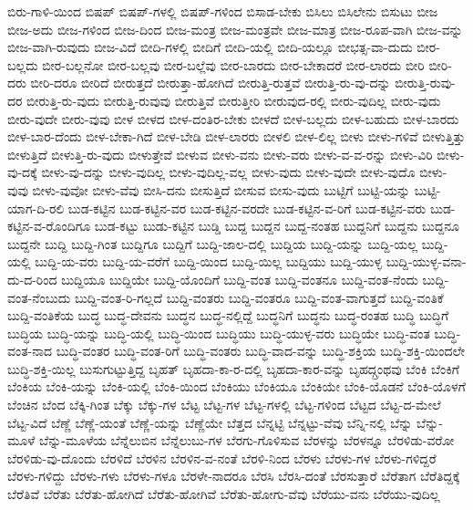 {ಬಿರು-ಗಾಳಿ-ಯಿಂದ
ಬಿಷಪ್
ಬಿಷಪ್-ಗಳಲ್ಲಿ
ಬಿಷಪ್-ಗಳಿಂದ
ಬಿಸಾಡ-ಬೇಕು
ಬಿಸಿಲು
ಬಿಸಿಲೇನು
ಬಿಸುಟು
ಬೀಜ
ಬೀಜ-ಅದು
ಬೀಜ-ಗಳಿಂದ
ಬೀಜ-ದಿಂದ
ಬೀಜ-ಮಂತ್ರ
ಬೀಜ-ಮಂತ್ರವೇ
ಬೀಜ-ಮಾತ್ರ
ಬೀಜ-ರೂಪ-ವಾಗಿ
ಬೀಜ-ವನ್ನು
ಬೀಜ-ವಾಗಿ-ರುವುದು
ಬೀಜ-ವಿದೆ
ಬೀದಿ-ಗಳಲ್ಲಿ
ಬೀದಿಗೆ
ಬೀದಿ-ಯಲ್ಲಿ
ಬೀದಿ-ಯಲ್ಲೂ
ಬೀಭತ್ಸ-ವಾ-ದುದು
ಬೀರ-ಬಲ್ಲದು
ಬೀರ-ಬಲ್ಲನೋ
ಬೀರ-ಬಲ್ಲವು
ಬೀರ-ಬಲ್ಲೆವು
ಬೀರ-ಬಾರದು
ಬೀರ-ಬೇಕಾದರೆ
ಬೀರ-ಲಾರದು
ಬೀರಿ
ಬೀರಿ-ದರು
ಬೀರಿ-ದರೂ
ಬೀರಿದೆ
ಬೀರುತ್ತದೆ
ಬೀರುತ್ತಾ-ಹೋಗಿದೆ
ಬೀರುತ್ತಿ-ರುತ್ತವೆ
ಬೀರುತ್ತಿ-ರು-ವು-ದನ್ನು
ಬೀರುತ್ತಿ-ರುವು-ದರ
ಬೀರುತ್ತಿ-ರು-ವುದು
ಬೀರುತ್ತಿ-ರುವುವು
ಬೀರುತ್ತಿವೆ
ಬೀರುತ್ತೀರಿ
ಬೀರುವುದ-ರಲ್ಲಿ
ಬೀರು-ವುದಿಲ್ಲ
ಬೀರು-ವುದು
ಬೀರು-ವುದೇ
ಬೀರು-ವುವು
ಬೀಳ
ಬೀಳದ
ಬೀಳ-ದಂತಿರ-ಬೇಕು
ಬೀಳದೆ
ಬೀಳ-ಬಲ್ಲದು
ಬೀಳ-ಬಹುದು
ಬೀಳ-ಬಾರದು
ಬೀಳ-ಬಾರ-ದೆಂದು
ಬೀಳ-ಬೇಕಾ-ಗಿದೆ
ಬೀಳ-ಬೇಡಿ
ಬೀಳ-ಲಾರರು
ಬೀಳಲಿ
ಬೀಳ-ಲಿಲ್ಲ
ಬೀಳು
ಬೀಳು-ಗಳಿವೆ
ಬೀಳುತ್ತಿತ್ತು
ಬೀಳುತ್ತಿದೆ
ಬೀಳುತ್ತಿ-ರು-ವುದು
ಬೀಳುತ್ತೇವೆ
ಬೀಳುವ
ಬೀಳು-ವನು
ಬೀಳು-ವರು
ಬೀಳು-ವ-ವ-ರನ್ನು
ಬೀಳು-ವಿರಿ
ಬೀಳು-ವು-ದಕ್ಕೆ
ಬೀಳು-ವು-ದನ್ನು
ಬೀಳು-ವುದಿಲ್ಲ
ಬೀಳು-ವುದಿಲ್ಲ-ವಲ್ಲ
ಬೀಳು-ವುದು
ಬೀಳು-ವುದೇ
ಬೀಳು-ವುದೊ
ಬೀಳು-ವುವು
ಬೀಳು-ವುವೋ
ಬೀಳು-ವೆವು
ಬೀಸಿ-ದನು
ಬೀಸುತ್ತಿದೆ
ಬೀಸುವ
ಬೀಸು-ವುದು
ಬುಟ್ಟಿಗೆ
ಬುಟ್ಟಿ-ಯನ್ನು
ಬುಟ್ಟಿ-ಯಾಗ-ದಿ-ರಲಿ
ಬುಡ-ಕಟ್ಟಿನ
ಬುಡ-ಕಟ್ಟಿನ-ವರ
ಬುಡ-ಕಟ್ಟಿನ-ವರದೇ
ಬುಡ-ಕಟ್ಟಿನ-ವ-ರಿಗೆ
ಬುಡ-ಕಟ್ಟಿನ-ವರು
ಬುಡ-ಕಟ್ಟಿನ-ವ-ರೊಂದಿಗೂ
ಬುಡ-ಕಟ್ಟು
ಬುಡು-ಕಟ್ಟಿನ
ಬುಡ್ಡಿ
ಬುದ್ದ
ಬುದ್ದನ
ಬುದ್ದ-ನಂತಹ
ಬುದ್ದನಿಗೆ
ಬುದ್ದನು
ಬುದ್ದನೂ
ಬುದ್ದನೇ
ಬುದ್ದಿ
ಬುದ್ದಿ-ಗಿಂತ
ಬುದ್ದಿಗೂ
ಬುದ್ದಿಗೆ
ಬುದ್ದಿ-ಜಾಲ-ದಲ್ಲಿ
ಬುದ್ದಿಯ
ಬುದ್ದಿ-ಯನ್ನು
ಬುದ್ದಿ-ಯಲ್ಲ
ಬುದ್ದಿ-ಯಲ್ಲಿ
ಬುದ್ದಿ-ಯ-ವರು
ಬುದ್ದಿ-ಯ-ವರೆಗೆ
ಬುದ್ದಿ-ಯಿಂದ
ಬುದ್ದಿ-ಯಿಲ್ಲ
ಬುದ್ದಿಯು
ಬುದ್ದಿ-ಯುಳ್ಳ
ಬುದ್ದಿ-ಯುಳ್ಳ-ವನಾ-ದು-ದ-ರಿಂದ
ಬುದ್ದಿಯೂ
ಬುದ್ದಿಯೇ
ಬುದ್ದಿ-ಯೊಂದಿಗೆ
ಬುದ್ದಿ-ವಂತ
ಬುದ್ದಿ-ವಂತನೂ
ಬುದ್ದಿ-ವಂತ-ನೆಂದು
ಬುದ್ದಿ-ವಂತ-ನೆಂಬುದು
ಬುದ್ದಿ-ವಂತ-ರಿ-ಗಲ್ಲದೆ
ಬುದ್ದಿ-ವಂತರು
ಬುದ್ದಿ-ವಂತರೂ
ಬುದ್ದಿ-ವಂತ-ವಾಗುತ್ತದೆ
ಬುದ್ದಿ-ವಂತಿಕೆ
ಬುದ್ದಿ-ವಂತಿಕೆಯ
ಬುದ್ಧ
ಬುದ್ಧ-ದೇವನು
ಬುದ್ಧನ
ಬುದ್ಧ-ನಲ್ಲಿದ್ದೆ
ಬುದ್ಧನಿಗೆ
ಬುದ್ಧನು
ಬುದ್ಧ-ರಂತಹ
ಬುದ್ಧಿ
ಬುದ್ಧಿಗೆ
ಬುದ್ಧಿಯ
ಬುದ್ಧಿ-ಯನ್ನು
ಬುದ್ಧಿ-ಯಲ್ಲಿ
ಬುದ್ಧಿ-ಯಿಂದ
ಬುದ್ಧಿಯು
ಬುದ್ಧಿ-ಯುಳ್ಳ-ವರು
ಬುದ್ಧಿಯೇ
ಬುದ್ಧಿ-ವಂತ
ಬುದ್ಧಿ-ವಂತ-ನಾದ
ಬುದ್ಧಿ-ವಂತರ
ಬುದ್ಧಿ-ವಂತ-ರಿಗೆ
ಬುದ್ಧಿ-ವಂತರು
ಬುದ್ಧಿ-ವಾದ-ವನ್ನು
ಬುದ್ಧಿ-ಶಕ್ತಿಯ
ಬುದ್ಧಿ-ಶಕ್ತಿ-ಯಿಂದಲೇ
ಬುದ್ಧಿ-ಶಕ್ತಿ-ಯಿಲ್ಲ
ಬುಸುಗುಟ್ಟುತ್ತಿದ್ದ
ಬೃಹತ್
ಬೃಹದಾ-ಕಾ-ರ-ದಲ್ಲಿ
ಬೃಹದಾ-ಕಾರ-ವನ್ನು
ಬೃಹದ್ಗ್ರಂಥವು
ಬೆಂಕಿ
ಬೆಂಕಿಗೆ
ಬೆಂಕಿಯ
ಬೆಂಕಿ-ಯನ್ನು
ಬೆಂಕಿ-ಯಲ್ಲಿ
ಬೆಂಕಿ-ಯಿಂದ
ಬೆಂಕಿಯು
ಬೆಂಕಿಯೂ
ಬೆಂಕಿಯೇ
ಬೆಂಕಿ-ಯೊಡನೆ
ಬೆಂಕಿ-ಯೊಳಗೆ
ಬೆಂಚಿನ
ಬೆಂದ
ಬೆಕ್ಕಿ-ಗಿಂತ
ಬೆಕ್ಕು
ಬೆಕ್ಕು-ಗಳ
ಬೆಟ್ಟ
ಬೆಟ್ಟ-ಗಳ
ಬೆಟ್ಟ-ಗಳಲ್ಲಿ
ಬೆಟ್ಟ-ಗಳಿಂದ
ಬೆಟ್ಟದ
ಬೆಟ್ಟ-ದ-ಮೇಲೆ
ಬೆಟ್ಟ-ವಿದೆ
ಬೆಣ್ಣೆ
ಬೆಣ್ಣೆ-ಯಂತೆ
ಬೆಣ್ಣೆ-ಯನ್ನು
ಬೆಣ್ಣೆಯೇ
ಬೆತ್ತದ
ಬೆನ್ನಟ್ಟಿ
ಬೆನ್ನಟ್ಟು-ವೆವು
ಬೆನ್ನಿ-ನಲ್ಲಿ
ಬೆನ್ನು
ಬೆನ್ನು-ಮೂಳೆ
ಬೆನ್ನು-ಮೂಳೆಯ
ಬೆನ್ನೆಲುಬಿನ
ಬೆನ್ನೆಲುಬು-ಗಳ
ಬೆರಗು-ಗೊಳಿಸುವ
ಬೆರಳನ್ನು
ಬೆರಳನ್ನೂ
ಬೆರಳಿಡು-ವರೋ
ಬೆರಳಿಡು-ವು-ದೊಂದು
ಬೆರಳಿದೆ
ಬೆರಳಿನ
ಬೆರಳಿನ-ವ-ನಂತೆ
ಬೆರಳಿ-ನಿಂದ
ಬೆರಳು
ಬೆರಳು-ಗಳ
ಬೆರಳು-ಗಳಿದ್ದರೆ
ಬೆರಳು-ಗಳಿದ್ದು
ಬೆರಳು-ಗಳು
ಬೆರಳು-ಗಳೂ
ಬೆರಳೇ-ನಾದರೂ
ಬೆರಸಿ
ಬೆರಸಿ-ದಂತೆ
ಬೆರಸುತ್ತಾರೆ
ಬೆರೆತಾಗ
ಬೆರೆತಿದ್ದಕ್ಕೆ
ಬೆರೆತಿವೆ
ಬೆರೆತು
ಬೆರೆತು-ಹೋಗಿದೆ
ಬೆರೆತು-ಹೋಗಿವೆ
ಬೆರೆತು-ಹೋಗು-ವೆವು
ಬೆರೆಯು-ವನು
ಬೆರೆಯು-ವುದಿಲ್ಲ
}
